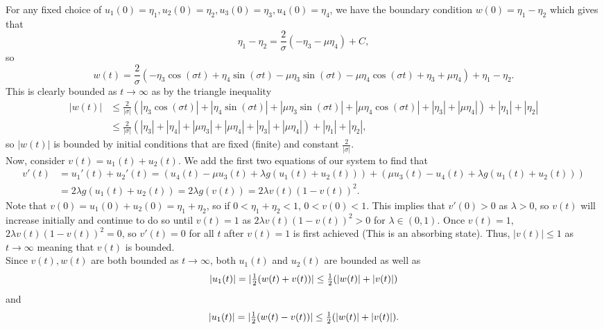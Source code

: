 \documentclass{article}
\begin{document}
For any fixed choice of $u_1(0) = \eta_1,u_2(0) = \eta_2,u_3(0) = \eta_3,u _4(0) = \eta_4$, we have the boundary condition $w(0)=\eta_1-\eta_2$ which gives that
\[
\eta_1-\eta_2=\frac{2}{\sigma}(-\eta_3-\mu\eta_4)+C,
\]
so
\[
w(t)=\frac{2}{\sigma}(-\eta_3\cos(\sigma t)+\eta_4\sin(\sigma t)-\mu\eta_3\sin(\sigma t)-\mu\eta_4\cos(\sigma t)+\eta_3+\mu\eta_4)+\eta_1-\eta_2.
\]
This is clearly bounded as $t\to\infty$ as by the triangle inequality 
\begin{align*}
|w(t)|&\leq \frac{2}{|\sigma|}(|\eta_3\cos(\sigma t)|+|\eta_4\sin(\sigma t)|+|\mu\eta_3\sin(\sigma t)|+|\mu\eta_4\cos(\sigma t)|+|\eta_3|+|\mu\eta_4|)+|\eta_1|+|\eta_2|\\&\leq
\frac{2}{|\sigma|}(|\eta_3|+|\eta_4|+|\mu\eta_3|+|\mu\eta_4|+|\eta_3|+|\mu\eta_4|)+|\eta_1|+|\eta_2|,
\end{align*}
so $|w(t)|$ is bounded by initial conditions that are fixed (finite) and constant $\frac{2}{|\sigma|}$.\\
Now, consider $v(t)=u_1(t)+u_2(t)$. We add the first two equations of our system to find that
\begin{align*}
	v'(t)&=u_1'(t)+u_2'(t)=(u_4(t) - \mu u_3(t) + \lambda g(u_1(t) + u_2(t)))+(\mu u_3(t) - u_4(t) +  \lambda g(u_1(t) + u_2(t)))\\&=
	2\lambda g(u_1(t) + u_2(t))=2\lambda g(v(t))=2\lambda v(t)(1-v(t))^2.
\end{align*}
Note that $v(0)=u_1(0)+u_2(0)=\eta_1+\eta_2$, so if $0<\eta_1+\eta_2<1$, $0<v(0)<1$. This implies that $v'(0)>0$ as $\lambda>0$, so $v(t)$ will increase initially and continue to do so until $v(t)=1$ as $2\lambda v(t)(1-v(t))^2>0$ for $\lambda\in (0,1)$. Once $v(t)=1$, $2\lambda v(t)(1-v(t))^2=0$, so $v'(t)=0$ for all $t$ after $v(t)=1$ is first achieved (This is an absorbing state). Thus, $|v(t)|\leq1$ as $t\to\infty$ meaning that $v(t)$ is bounded. \\
Since $v(t),w(t)$ are both bounded as $t\to\infty$, both $u_1(t)$ and $u_2(t)$ are bounded as well as
\[
|u_1(t)|=|\mbox{$\frac{1}{2}$}(w(t)+v(t))|\leq\mbox{$\frac{1}{2}$}(|w(t)|+|v(t)|)
\]
and
\[
|u_1(t)|=|\mbox{$\frac{1}{2}$}(w(t)-v(t))|\leq\mbox{$\frac{1}{2}$}(|w(t)|+|v(t)|).
\]
\end{document}
